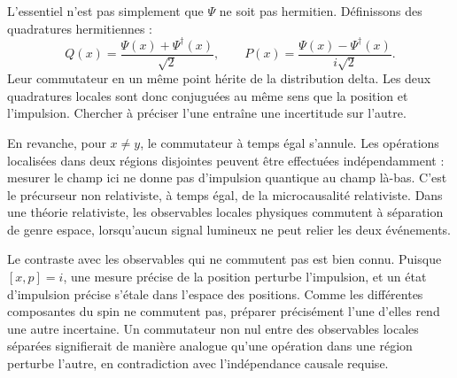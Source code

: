 L’essentiel n’est pas simplement que \(\Psi\) ne soit pas hermitien. Définissons des quadratures hermitiennes :
\begin{equation}
Q(x)=\frac{\Psi(x)+\Psi^\dagger(x)}{\sqrt{2}},
\qquad
P(x)=\frac{\Psi(x)-\Psi^\dagger(x)}{i\sqrt{2}}.
\end{equation}
Leur commutateur en un même point hérite de la distribution delta. Les deux quadratures locales sont donc conjuguées au même sens que la position et l’impulsion. Chercher à préciser l’une entraîne une incertitude sur l’autre.

\begin{classroomqa}
\end{classroomqa}

En revanche, pour \(x\neq y\), le commutateur à temps égal s’annule. Les opérations localisées dans deux régions disjointes peuvent être effectuées indépendamment : mesurer le champ ici ne donne pas d’impulsion quantique au champ là-bas. C’est le précurseur non relativiste, à temps égal, de la microcausalité relativiste. Dans une théorie relativiste, les observables locales physiques commutent à séparation de genre espace, lorsqu’aucun signal lumineux ne peut relier les deux événements.

Le contraste avec les observables qui ne commutent pas est bien connu. Puisque \([x,p]=i\), une mesure précise de la position perturbe l’impulsion, et un état d’impulsion précise s’étale dans l’espace des positions. Comme les différentes composantes du spin ne commutent pas, préparer précisément l’une d’elles rend une autre incertaine. Un commutateur non nul entre des observables locales séparées signifierait de manière analogue qu’une opération dans une région perturbe l’autre, en contradiction avec l’indépendance causale requise.

\begin{classroomqa}
\end{classroomqa}

